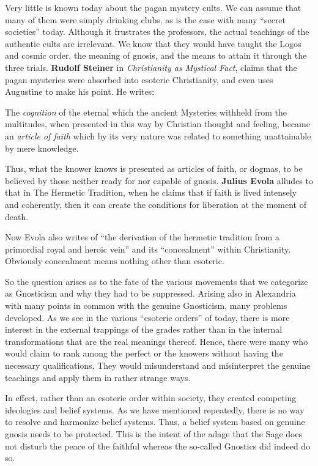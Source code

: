 Very little is known today about the pagan mystery cults. We can assume that many of them were simply drinking clubs, as is the case with many ``secret societies'' today. Although it frustrates the professors, the actual teachings of the authentic cults are irrelevant. We know that they would have taught the Logos and cosmic order, the meaning of gnosis, and the means to attain it through the three trials. \textbf{Rudolf Steiner} in \textit{Christianity as Mystical Fact}, claims that the pagan mysteries were absorbed into esoteric Christianity, and even uses Augustine to make his point. He writes:

\begin{quotex}
The \emph{cognition} of the eternal which the ancient Mysteries withheld from the multitudes, when presented in this way by Christian thought and feeling, became an \emph{article of faith} which by its very nature was related to something unattainable by mere knowledge.
\end{quotex}


Thus, what the knower knows is presented as articles of faith, or dogmas, to be believed by those neither ready for nor capable of gnosis. \textbf{Julius Evola} alludes to that in The Hermetic Tradition, when he claims that if faith is lived intensely and coherently, then it can create the conditions for liberation at the moment of death.

Now Evola also writes of ``the derivation of the hermetic tradition from a primordial royal and heroic vein'' and its ``concealment'' within Christianity. Obviously concealment means nothing other than esoteric.

So the question arises as to the fate of the various movements that we categorize as Gnosticism and why they had to be suppressed. Arising also in Alexandria with many points in common with the genuine Gnosticism, many problems developed. As we see in the various ``esoteric orders'' of today, there is more interest in the external trappings of the grades rather than in the internal transformations that are the real meanings thereof. Hence, there were many who would claim to rank among the perfect or the knowers without having the necessary qualifications. They would misunderstand and misinterpret the genuine teachings and apply them in rather strange ways.

In effect, rather than an esoteric order within society, they created competing ideologies and belief systems. As we have mentioned repeatedly, there is no way to resolve and harmonize belief systems. Thus, a belief system based on genuine gnosis needs to be protected. This is the intent of the adage that the Sage does not disturb the peace of the faithful whereas the so-called Gnostics did indeed do so.

